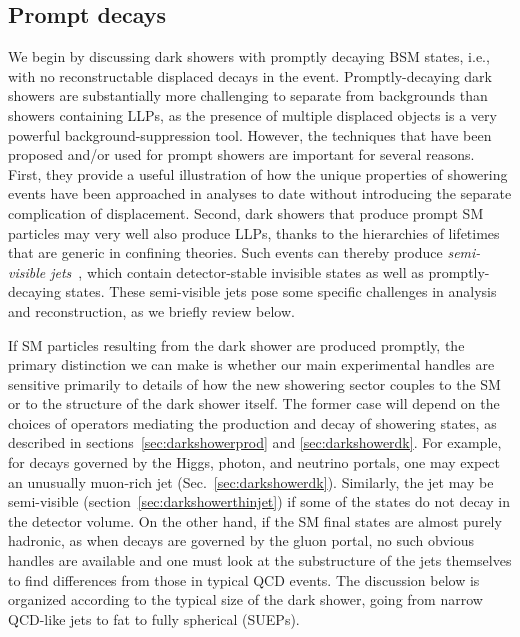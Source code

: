 \subsection{Prompt decays}
\label{sec:darkshowerprompt}

 We begin by discussing dark showers with promptly decaying BSM states, i.e., with no reconstructable displaced decays in the event.  Promptly-decaying dark showers are substantially more challenging to separate from backgrounds than showers containing LLPs, as the presence of multiple displaced objects is a very powerful background-suppression tool.  However, the techniques that have been proposed and/or used for prompt showers are important for several reasons. First, they provide a useful illustration of how the unique properties of showering events have been approached in analyses to date without introducing the separate complication of displacement.  Second, dark showers that produce prompt SM particles may very well also produce LLPs, thanks to the hierarchies of lifetimes that are generic in confining theories.  Such events can thereby produce {\em semi-visible jets}~\cite{Cohen:2015toa}, which contain detector-stable invisible states as well as promptly-decaying states.  These semi-visible jets pose some specific challenges in analysis and reconstruction, as we briefly review below. 

If SM particles resulting from the dark shower are produced promptly, the primary distinction we can make is whether our main experimental handles are sensitive primarily to details of how the new showering sector couples to the SM or to the structure of the dark shower itself. 
The former case will depend on the
choices of operators mediating the production and decay of showering states, as described in sections~\ref{sec:darkshowerprod} and \ref{sec:darkshowerdk}.
For example, for decays governed by the Higgs, photon, and neutrino portals, one may expect an unusually muon-rich jet (Sec.~\ref{sec:darkshowerdk}). Similarly, the jet may be semi-visible (section~\ref{sec:darkshowerthinjet}) if some of the states do not decay in the detector volume. On the other hand, if the SM final states are almost purely hadronic, as when decays are governed by the gluon portal, no such obvious handles are available and one must look at the substructure of the jets themselves to find differences from those in typical QCD events. The discussion below is organized according to the typical size of the dark shower, going from narrow QCD-like jets to fat to fully spherical (SUEPs).



